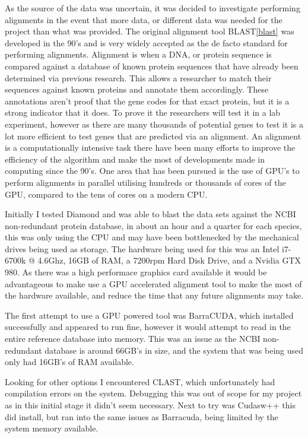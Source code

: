 As the source of the data was uncertain, it was decided to investigate performing alignments in the event that more data, or different data was needed for the project than what was provided. The original alignment tool BLAST\ref{blast} was developed in the 90's and is very widely accepted as the de facto standard for performing alignments. Alignment is when a DNA, or protein sequence is compared against a database of known protein sequences that have already been determined via previous research. This allows a researcher to match their sequences against known proteins and annotate them accordingly. These annotations aren't proof that the gene codes for that exact protein, but it is a strong indicator that it does. To prove it the researchers will test it in a lab experiment, however as there are many thousands of potential genes to test it is a lot more efficient to test genes that are predicted via an alignment. An alignment is a computationally intensive task there have been many efforts to improve the efficiency of the algorithm and make the most of developments made in computing since the 90's. One area that has been pursued is the use of GPU's to perform alignments in parallel utilising hundreds or thousands of cores of the GPU, compared to the tens of cores on a modern CPU. 

Initially I tested Diamond\cite{diamond} and was able to blast the data sets against the NCBI\cite{ncbi} non-redundant protein database, in about an hour and a quarter for each species, this was only using the CPU and may have been bottlenecked by the mechanical drives being used as storage. The hardware being used for this was an Intel i7-6700k @ 4.6Ghz, 16GB of RAM, a 7200rpm Hard Disk Drive, and a Nvidia GTX 980. As there was a high performace graphics card available it would be advantageous to make use a GPU accelerated alignment tool to make the most of the hardware available, and reduce the time that any future alignments may take. 

The first attempt to use a GPU powered tool was BarraCUDA\cite{barracuda}, which installed successfully and appeared to run fine, however it would attempt to read in the entire reference database into memory. This was an issue as the NCBI non-redundant database is around 66GB's in size, and the system that was being used only had 16GB's of RAM available. 

Looking for other options I encountered CLAST\cite{clast}, which unfortunately had compilation errors on the system. Debugging this was out of scope for my project as in this initial stage it didn't seem necessary. Next to try was Cudasw++\cite{cudasw} this did install, but ran into the same issues as Barracuda, being limited by the system memory available. 

